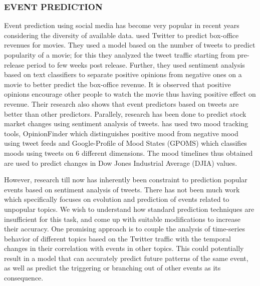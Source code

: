 \subsubsection{\uppercase{Event Prediction}}
Event prediction using social media has become very popular in recent years considering the diversity of available data. \cite{asur2010predicting} used Twitter to predict box-office revenues for movies. They used a model based on the number of tweets to predict popularity of a movie; for this they analyzed the tweet traffic starting from pre-release period to few weeks post release. Further, they used sentiment analysis based on text classifiers to separate positive opinions from negative ones on a movie to better predict the box-office revenue. It is observed that positive opinions encourage other people to watch the movie thus having positive effect on revenue. Their research also shows that event predictors based on tweets are better than other predictors. Parallely, research has been done to predict stock market changes using sentiment analysis of tweets. \cite{bollen2011twitter} has used two mood tracking tools, OpinionFinder which distinguishes positive mood from negative mood using tweet feeds and Google-Profile of Mood States (GPOMS) which classifies moods using tweets on 6 different dimensions. The mood timelines thus obtained are used to predict changes in Dow Jones Industrial Average (DJIA) values.

However, research till now has inherently been constraint to prediction popular events based on sentiment analysis of tweets. There has not been much work which specifically focuses on evolution and prediction of events related to unpopular topics. We wish to understand how standard prediction techniques are insufficient for this task, and come up with suitable modifications to increase their accuracy. One promising approach is to couple the analysis of time-series behavior of different topics based on the Twitter traffic with the temporal changes in their correlation with events in other topics. This could potentially result in a model that can accurately predict future patterns of the same event, as well as predict the triggering or branching out of other events as its consequence.